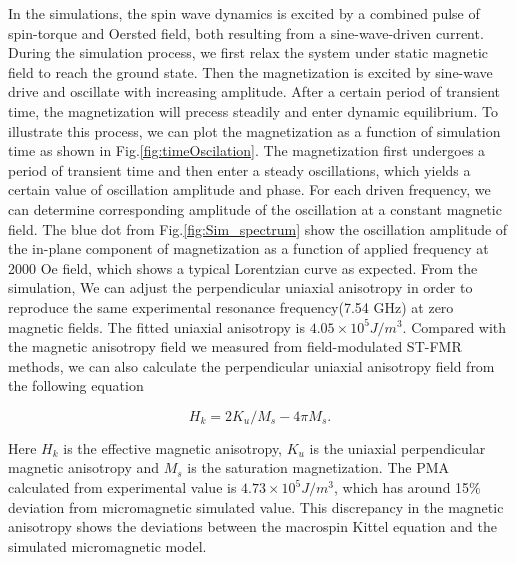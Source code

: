 In the simulations, the spin wave dynamics is excited by a combined pulse of spin-torque and Oersted field, both resulting from a sine-wave-driven current. During the simulation process, we first relax the system under static magnetic field to reach the ground state. Then the magnetization is excited by sine-wave drive and oscillate with increasing amplitude. After a certain period of transient time, the magnetization will precess steadily and enter dynamic equilibrium. To illustrate this process, we can plot the magnetization as a function of simulation time as shown in Fig.\ref{fig:timeOscilation}. The magnetization first undergoes a period of transient time and then enter a steady oscillations, which yields a certain value of oscillation amplitude and phase. For each driven frequency, we can determine corresponding amplitude of the oscillation at a constant magnetic field. The blue dot from Fig.\ref{fig:Sim_spectrum} show the oscillation amplitude of the in-plane component of magnetization as a function of applied  frequency at 2000 Oe field, which shows a typical Lorentzian curve as expected\cite{Tulapurkar2005}. From the simulation, We can adjust the perpendicular uniaxial anisotropy in order to reproduce the same experimental resonance frequency(7.54 GHz) at zero magnetic fields. The fitted uniaxial anisotropy  is $4.05 \times 10^5 J/ m^3$. Compared with the magnetic anisotropy field we measured from field-modulated ST-FMR methods, we can also calculate the perpendicular uniaxial anisotropy field from the following equation \cite{Ohno2010}

\begin{equation}\label{eq:hk}
H_k = 2 K_u /M_ s - 4 \pi M_s . 
\end{equation}


Here $H_k$ is the effective magnetic anisotropy, $K_u$ is the uniaxial perpendicular magnetic anisotropy and $M_s$ is the saturation magnetization. The PMA calculated from experimental value is $4.73 \times 10^5 J/ m^3$, which has around 15\% deviation from micromagnetic simulated value. This discrepancy in the magnetic anisotropy shows the deviations between the macrospin Kittel equation and the simulated micromagnetic model.  


